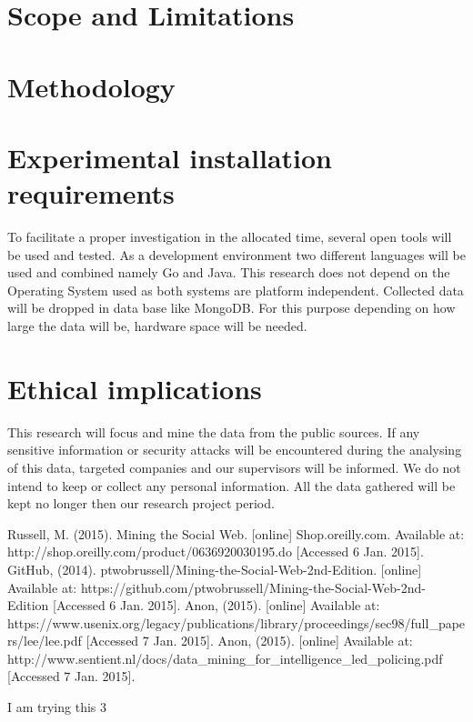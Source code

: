 \documentclass[12pt]{article}
\begin{document}
\section{Scope and Limitations}

 
\section{Methodology}
\paragraph{}

\section{Experimental installation requirements}

To facilitate a proper investigation in the allocated time, several open tools will be used and tested. As a development environment two different languages will be used and combined namely Go and Java. This research does not depend on the Operating System used as both systems are platform independent. Collected data will be dropped in data base like MongoDB. For this purpose depending on how large the data will be, hardware space will be needed.

\section{Ethical implications}

This research will focus and mine the data from the public sources. If any sensitive information or security attacks will be encountered during the analysing of this data, targeted companies and our supervisors will be informed. We do not intend to keep or collect any personal information. All the data gathered will be kept no longer then our research project period. 




\begin{thebibliography}{99}
  Russell, M. (2015). Mining the Social Web. [online] Shop.oreilly.com. Available at: http://shop.oreilly.com/product/0636920030195.do [Accessed 6 Jan. 2015].
  GitHub, (2014). ptwobrussell/Mining-the-Social-Web-2nd-Edition. [online] Available at: https://github.com/ptwobrussell/Mining-the-Social-Web-2nd-Edition [Accessed 6 Jan. 2015].
Anon, (2015). [online] Available at: https://www.usenix.org/legacy/publications/library/proceedings/sec98/full\_papers/lee/lee.pdf [Accessed 7 Jan. 2015].
Anon, (2015). [online] Available at: http://www.sentient.nl/docs/data\_mining\_for\_intelligence\_led\_policing.pdf [Accessed 7 Jan. 2015].

  I am trying this 3
\end{thebibliography}
\end{document}
